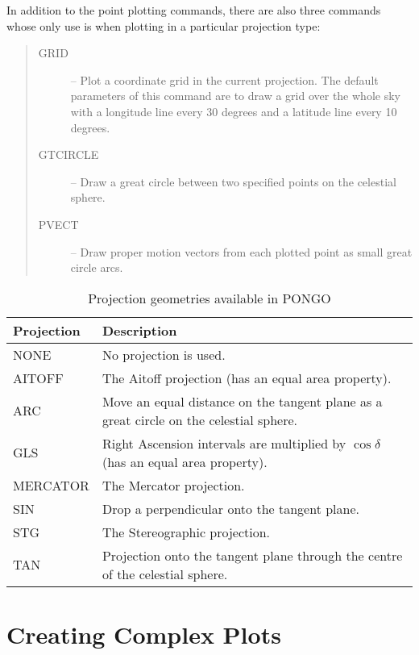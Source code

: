 \documentclass[twoside,11pt]{article}
\newcommand{\htmlref}[2]{#1}
\renewcommand{\_}{\texttt{\symbol{95}}}
\newcommand{\iref} [1]{\htmlref{#1}{#1}}
\begin{document}
In addition to the point plotting commands, there are also three commands whose
only use is when plotting in a particular projection type:

\begin {quote}
\begin{description}
\item [\iref{GRID}] -- Plot a coordinate grid in the current projection.
                       The default parameters of this command are to draw a
                       grid over the whole sky with a longitude line every 30
                       degrees and a latitude line every 10 degrees.
\item [\iref{GT\_CIRCLE}] -- Draw a great circle between two specified points
                             on the celestial sphere.
\item [\iref{PVECT}] -- Draw proper motion vectors from each plotted point as
                        small great circle arcs.
\end{description}
\end {quote}

\begin{table}[t]
\centering
\begin{tabular}{|l|p{}|}
\hline
Projection & Description \\
\hline
NONE     & No projection is used. \\
AITOFF   & The Aitoff projection (has an equal area property). \\
ARC      & Move an equal distance on the tangent plane as a great circle on the
celestial sphere. \\
GLS      & Right Ascension intervals are multiplied by $\cos\delta$ (has an
equal area property). \\
MERCATOR & The Mercator projection. \\
SIN      & Drop a perpendicular onto the tangent plane. \\
STG      & The Stereographic projection. \\
TAN      & Projection onto the tangent plane through the centre of the
celestial sphere. \\
\hline
\end{tabular}
\caption{Projection geometries available in PONGO} \label{proj_tab}
\end{table}


\section{Creating Complex Plots}
\end{document}
